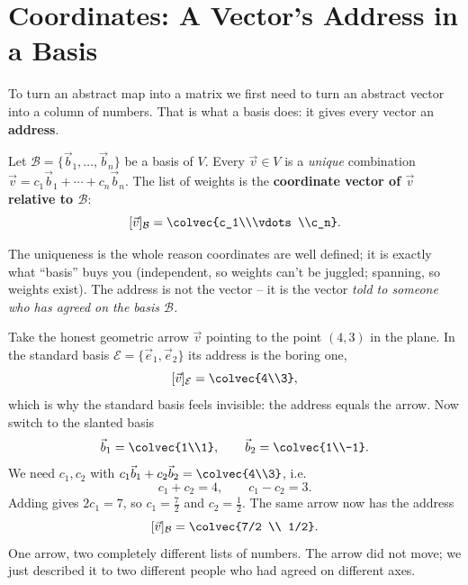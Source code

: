 \section{Coordinates: A Vector's Address in a Basis}
\label{ch31:coordinates}

To turn an abstract map into a matrix we first need to turn an abstract vector
into a column of numbers. That is what a basis does: it gives every vector an
\textbf{address}.

\begin{definition}
\label{ch31:def-coords}
Let $\mathcal{B} = \{\vec{b}_1,\dots,\vec{b}_n\}$ be a basis of $V$. Every
$\vec{v}\in V$ is a \emph{unique} combination
$\vec{v} = c_1\vec{b}_1 + \cdots + c_n\vec{b}_n$. The list of weights is the
\textbf{coordinate vector of $\vec{v}$ relative to $\mathcal{B}$}:
\[
  [\vec{v}]_{\mathcal{B}} = \colvec{c_1\\\vdots\\c_n}.
\]
\end{definition}

The uniqueness is the whole reason coordinates are well defined; it is exactly
what ``basis'' buys you (independent, so weights can't be juggled; spanning, so
weights exist). The address is not the vector -- it is the vector \emph{told to
someone who has agreed on the basis $\mathcal{B}$.}

\begin{example}
\label{ch31:ex-two-addresses}
Take the honest geometric arrow $\vec{v}$ pointing to the point $(4,3)$ in the
plane. In the standard basis $\mathcal{E}=\{\vec{e}_1,\vec{e}_2\}$ its address is
the boring one,
\[
  [\vec{v}]_{\mathcal{E}} = \colvec{4\\3},
\]
which is why the standard basis feels invisible: the address equals the arrow.
Now switch to the slanted basis
\[
  \vec{b}_1 = \colvec{1\\1}, \qquad \vec{b}_2 = \colvec{1\\-1}.
\]
We need $c_1,c_2$ with $c_1\vec{b}_1 + c_2\vec{b}_2 = \colvec{4\\3}$, i.e.
\[
  c_1 + c_2 = 4, \qquad c_1 - c_2 = 3.
\]
Adding gives $2c_1 = 7$, so $c_1 = \tfrac72$ and $c_2 = \tfrac12$. The same arrow
now has the address
\[
  [\vec{v}]_{\mathcal{B}} = \colvec{7/2 \\ 1/2}.
\]
One arrow, two completely different lists of numbers. The arrow did not move; we
just described it to two different people who had agreed on different axes.
\end{example}

